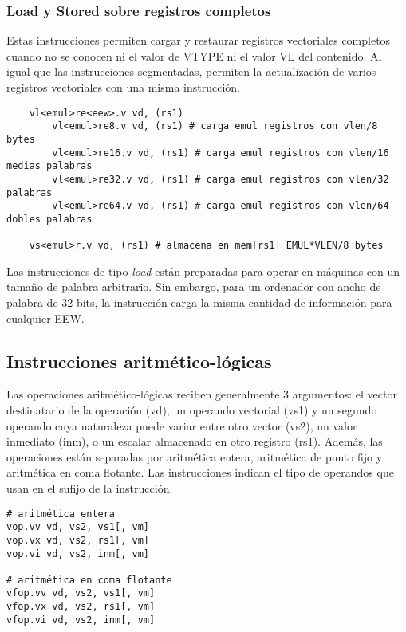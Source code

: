 \subsubsection{Load y Stored sobre registros completos}

Estas instrucciones permiten cargar y restaurar registros vectoriales
completos cuando no se conocen ni el valor de VTYPE ni el valor VL del
contenido. Al igual que las instrucciones segmentadas, permiten la
actualización de varios registros vectoriales con una misma instrucción.

\begin{lstlisting}
    vl<emul>re<eew>.v vd, (rs1)
        vl<emul>re8.v vd, (rs1) # carga emul registros con vlen/8 bytes
        vl<emul>re16.v vd, (rs1) # carga emul registros con vlen/16 medias palabras
        vl<emul>re32.v vd, (rs1) # carga emul registros con vlen/32 palabras
        vl<emul>re64.v vd, (rs1) # carga emul registros con vlen/64 dobles palabras

    vs<emul>r.v vd, (rs1) # almacena en mem[rs1] EMUL*VLEN/8 bytes
\end{lstlisting}

Las instrucciones de tipo \textit{load} están preparadas para operar en
máquinas con un tamaño de palabra arbitrario. Sin embargo, para un ordenador
con ancho de palabra de 32 bits, la instrucción carga la misma cantidad de
información para cualquier EEW.

\subsection{Instrucciones aritmético-lógicas}

Las operaciones aritmético-lógicas reciben generalmente 3 argumentos: el vector
destinatario de la operación (vd), un operando vectorial (vs1) y un segundo
operando cuya naturaleza puede variar entre otro vector (vs2), un valor
inmediato (inm), o un escalar almacenado en otro registro (rs1). Además, las
operaciones están separadas por aritmética entera, aritmética de punto fijo y
aritmética en coma flotante. Las instrucciones indican el tipo de operandos que
usan en el sufijo de la instrucción.

\begin{lstlisting}
# aritmética entera
vop.vv vd, vs2, vs1[, vm]
vop.vx vd, vs2, rs1[, vm]
vop.vi vd, vs2, inm[, vm]

# aritmética en coma flotante
vfop.vv vd, vs2, vs1[, vm]
vfop.vx vd, vs2, rs1[, vm]
vfop.vi vd, vs2, inm[, vm]
\end{lstlisting}

